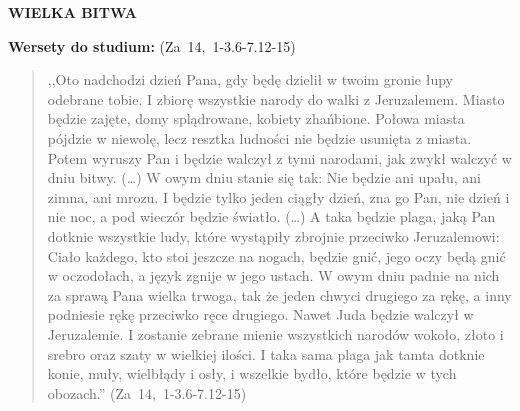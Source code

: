 \documentclass[10pt,a4paper,oneside]{article}
\begin{document}
\centerline{\textbf{\MakeUppercase{Wielka bitwa}}}
\begin{center}
\textbf{Wersety do studium:} \mbox{(Za 14, 1-3.6-7.12-15)}
\end{center}
\begin{quote}
,,Oto nadchodzi dzień Pana, gdy będę dzielił w twoim gronie łupy odebrane tobie. I zbiorę wszystkie narody do walki z Jeruzalemem. Miasto będzie zajęte, domy splądrowane, kobiety zhańbione. Połowa miasta pójdzie w niewolę, lecz resztka ludności nie będzie usunięta z miasta. Potem wyruszy Pan i będzie walczył z tymi narodami, jak zwykł walczyć w dniu bitwy. (\ldots) W owym dniu stanie się tak: Nie będzie ani upału, ani zimna, ani mrozu. I będzie tylko jeden ciągły dzień, zna go Pan, nie dzień i nie noc, a pod wieczór będzie światło. (\ldots) A taka będzie plaga, jaką Pan dotknie wszystkie ludy, które wystąpiły zbrojnie przeciwko Jeruzalemowi: Ciało każdego, kto stoi jeszcze na nogach, będzie gnić, jego oczy będą gnić w oczodołach, a język zgnije w jego ustach. W owym dniu padnie na nich za sprawą Pana wielka trwoga, tak że jeden chwyci drugiego za rękę, a inny podniesie rękę przeciwko ręce drugiego. Nawet Juda będzie walczył w Jeruzalemie. I zostanie zebrane mienie wszystkich narodów wokoło, złoto i srebro oraz szaty w wielkiej ilości. I taka sama plaga jak tamta dotknie konie, muły, wielbłądy i osły, i wszelkie bydło, które będzie w tych obozach.'' \mbox{(Za 14, 1-3.6-7.12-15)}
\end{quote}
\end{document}
